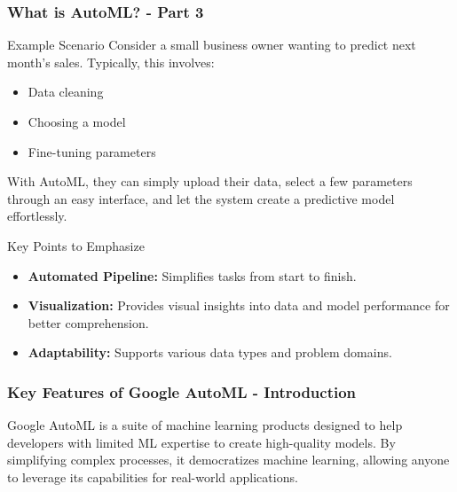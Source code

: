 \documentclass[aspectratio=169]{beamer}
\begin{document}
\begin{frame}[fragile]
    \frametitle{What is AutoML? - Part 3}
    \begin{block}{Example Scenario}
        Consider a small business owner wanting to predict next month's sales. Typically, this involves:
        \begin{itemize}
            \item Data cleaning
            \item Choosing a model
            \item Fine-tuning parameters
        \end{itemize}
        With AutoML, they can simply upload their data, select a few parameters through an easy interface, and let the system create a predictive model effortlessly.
    \end{block}

    \begin{block}{Key Points to Emphasize}
        \begin{itemize}
            \item \textbf{Automated Pipeline:} Simplifies tasks from start to finish.
            \item \textbf{Visualization:} Provides visual insights into data and model performance for better comprehension.
            \item \textbf{Adaptability:} Supports various data types and problem domains.
        \end{itemize}
    \end{block}
\end{frame}

\begin{frame}[fragile]
    \frametitle{Key Features of Google AutoML - Introduction}
    Google AutoML is a suite of machine learning products designed to help developers with limited ML expertise to create high-quality models. By simplifying complex processes, it democratizes machine learning, allowing anyone to leverage its capabilities for real-world applications.
\end{frame}
\end{document}

